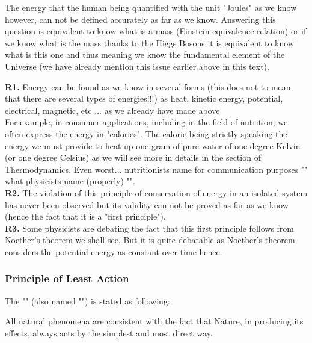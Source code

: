 	The energy that the human being quantified with the unit "Joules" as we know however, can not be defined accurately as far as we know. Answering this question is equivalent to know what is a mass (Einstein equivalence relation) or if we know what is the mass thanks to the Higgs Bosons it is equivalent to know what is this one and thus meaning we know the fundamental element of the Universe (we have already mention this issue earlier above in this text).
	
	\begin{tcolorbox}[title=Remark,colframe=black,arc=10pt]
	\textbf{R1.} Energy can be found as we know in several forms (this does not to mean that there are several types of energies!!!) as heat, kinetic energy, potential, electrical, magnetic, etc ... as we already have made above.\\

	For example, in consumer applications, including in the field of nutrition, we often express the energy in "calories". The calorie being strictly speaking the energy we must provide to heat up one gram of pure water of one degree Kelvin (or one degree Celsius) as we will see more in details in the section of Thermodynamics. Even worst... nutritionists name for communication purposes "" what physicists name (properly) "".\\
	
	\textbf{R2.} The violation of this principle of conservation of energy in an isolated system has never been observed but its validity can not be proved as far as we know (hence the fact that it is a "first principle").\\
	
	\textbf{R3.} Some physicists are debating the fact that this first principle follows from Noether's theorem we shall see. But it is quite debatable as Noether's theorem considers the potential energy as constant over time hence.
	\end{tcolorbox}
	
	\pagebreak
	\subsubsection{Principle of Least Action}
	The "" (also named "") is stated as following:

	All natural phenomena are consistent with the fact that Nature, in producing its effects, always acts by the simplest and most direct way.

